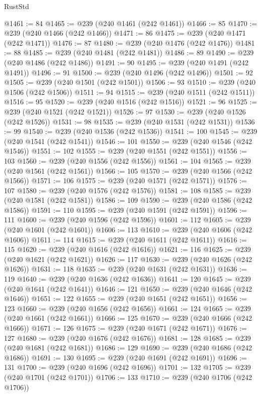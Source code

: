 \begin{lexlean}{RustStd}
\begin{coremodule}
{\begin{coremodule}
{{{{{{{{{{{{{{{{{{{{{{{{{{{{{{{{{{{{{{{{{{{{{{{{{{{{{{{{{{{{@1461 := 84
@1465 := @239 (@240 @1461 (@242 @1461))
@1466 := 85
@1470 := @239 (@240 @1466 (@242 @1466))
@1471 := 86
@1475 := @239 (@240 @1471 (@242 @1471))
@1476 := 87
@1480 := @239 (@240 @1476 (@242 @1476))
@1481 := 88
@1485 := @239 (@240 @1481 (@242 @1481))
@1486 := 89
@1490 := @239 (@240 @1486 (@242 @1486))
@1491 := 90
@1495 := @239 (@240 @1491 (@242 @1491))
@1496 := 91
@1500 := @239 (@240 @1496 (@242 @1496))
@1501 := 92
@1505 := @239 (@240 @1501 (@242 @1501))
@1506 := 93
@1510 := @239 (@240 @1506 (@242 @1506))
@1511 := 94
@1515 := @239 (@240 @1511 (@242 @1511))
@1516 := 95
@1520 := @239 (@240 @1516 (@242 @1516))
@1521 := 96
@1525 := @239 (@240 @1521 (@242 @1521))
@1526 := 97
@1530 := @239 (@240 @1526 (@242 @1526))
@1531 := 98
@1535 := @239 (@240 @1531 (@242 @1531))
@1536 := 99
@1540 := @239 (@240 @1536 (@242 @1536))
@1541 := 100
@1545 := @239 (@240 @1541 (@242 @1541))
@1546 := 101
@1550 := @239 (@240 @1546 (@242 @1546))
@1551 := 102
@1555 := @239 (@240 @1551 (@242 @1551))
@1556 := 103
@1560 := @239 (@240 @1556 (@242 @1556))
@1561 := 104
@1565 := @239 (@240 @1561 (@242 @1561))
@1566 := 105
@1570 := @239 (@240 @1566 (@242 @1566))
@1571 := 106
@1575 := @239 (@240 @1571 (@242 @1571))
@1576 := 107
@1580 := @239 (@240 @1576 (@242 @1576))
@1581 := 108
@1585 := @239 (@240 @1581 (@242 @1581))
@1586 := 109
@1590 := @239 (@240 @1586 (@242 @1586))
@1591 := 110
@1595 := @239 (@240 @1591 (@242 @1591))
@1596 := 111
@1600 := @239 (@240 @1596 (@242 @1596))
@1601 := 112
@1605 := @239 (@240 @1601 (@242 @1601))
@1606 := 113
@1610 := @239 (@240 @1606 (@242 @1606))
@1611 := 114
@1615 := @239 (@240 @1611 (@242 @1611))
@1616 := 115
@1620 := @239 (@240 @1616 (@242 @1616))
@1621 := 116
@1625 := @239 (@240 @1621 (@242 @1621))
@1626 := 117
@1630 := @239 (@240 @1626 (@242 @1626))
@1631 := 118
@1635 := @239 (@240 @1631 (@242 @1631))
@1636 := 119
@1640 := @239 (@240 @1636 (@242 @1636))
@1641 := 120
@1645 := @239 (@240 @1641 (@242 @1641))
@1646 := 121
@1650 := @239 (@240 @1646 (@242 @1646))
@1651 := 122
@1655 := @239 (@240 @1651 (@242 @1651))
@1656 := 123
@1660 := @239 (@240 @1656 (@242 @1656))
@1661 := 124
@1665 := @239 (@240 @1661 (@242 @1661))
@1666 := 125
@1670 := @239 (@240 @1666 (@242 @1666))
@1671 := 126
@1675 := @239 (@240 @1671 (@242 @1671))
@1676 := 127
@1680 := @239 (@240 @1676 (@242 @1676))
@1681 := 128
@1685 := @239 (@240 @1681 (@242 @1681))
@1686 := 129
@1690 := @239 (@240 @1686 (@242 @1686))
@1691 := 130
@1695 := @239 (@240 @1691 (@242 @1691))
@1696 := 131
@1700 := @239 (@240 @1696 (@242 @1696))
@1701 := 132
@1705 := @239 (@240 @1701 (@242 @1701))
@1706 := 133
@1710 := @239 (@240 @1706 (@242 @1706))
}}}}}}}}}}}}}}}}}}}}}}}}}}}}}}}}}}}}}}}}}}}}}}}}}}}}}}}}}}}}
\end{coremodule}}
\end{coremodule}
\end{lexlean}
